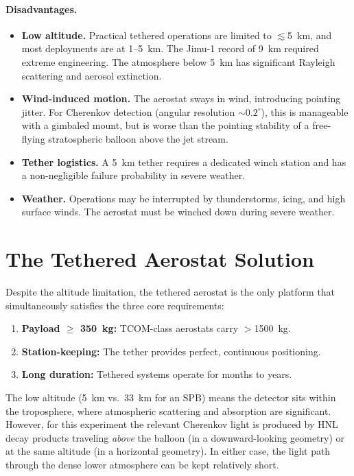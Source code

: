 \documentclass[11pt]{article}
\begin{document}
\paragraph{Disadvantages.}
\begin{itemize}[nosep]
  \item \textbf{Low altitude.}  Practical tethered operations are limited
        to $\lesssim$5~km, and most deployments are at 1--5~km.
        The Jimu-1 record of 9~km required extreme engineering.
        The atmosphere below 5~km has significant Rayleigh scattering and
        aerosol extinction.
  \item \textbf{Wind-induced motion.}  The aerostat sways in wind, introducing
        pointing jitter.  For Cherenkov detection (angular resolution
        $\sim 0.2^\circ$), this is manageable with a gimbaled mount,
        but is worse than the pointing stability of a free-flying
        stratospheric balloon above the jet stream.
  \item \textbf{Tether logistics.}  A 5~km tether requires a dedicated
        winch station and has a non-negligible failure probability in
        severe weather.
  \item \textbf{Weather.}  Operations may be interrupted by thunderstorms,
        icing, and high surface winds.  The aerostat must be winched down
        during severe weather.
\end{itemize}


\section{The Tethered Aerostat Solution}
\label{sec:tethered}

Despite the altitude limitation, the tethered aerostat is the only
platform that simultaneously satisfies the three core requirements:
\begin{enumerate}[nosep]
  \item \textbf{Payload $\geq$ 350~kg:}  TCOM-class aerostats carry
        $>$1500~kg.
  \item \textbf{Station-keeping:}  The tether provides perfect,
        continuous positioning.
  \item \textbf{Long duration:}  Tethered systems operate for months
        to years.
\end{enumerate}

The low altitude (5~km vs.\ 33~km for an SPB) means the detector sits
within the troposphere, where atmospheric scattering and absorption are
significant.  However, for this experiment the relevant Cherenkov light
is produced by HNL decay products traveling \emph{above} the balloon
(in a downward-looking geometry) or at the same altitude (in a horizontal
geometry).  In either case, the light path through the dense lower
atmosphere can be kept relatively short.
\end{document}
